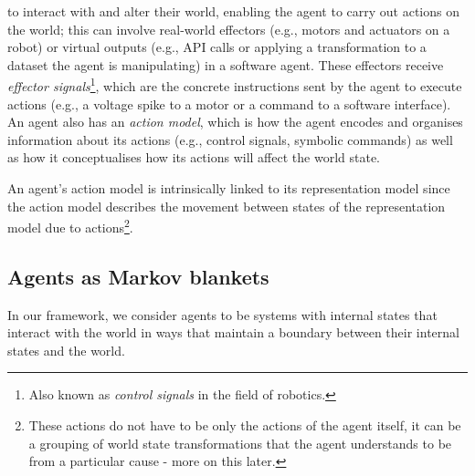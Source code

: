  to interact with and alter their world, enabling the agent to carry out actions on the world; this can involve real-world effectors (e.g., motors and actuators on a robot) or virtual outputs (e.g., API calls or applying a transformation to a dataset the agent is manipulating) in a software agent.
These effectors receive \emph{effector signals}\footnote{Also known as \emph{control signals} in the field of robotics.}, which are the concrete instructions sent by the agent to execute actions (e.g., a voltage spike to a motor or a command to a software interface).
An agent also has an \emph{action model}, which is how the agent encodes and organises information about its actions (e.g., control signals, symbolic commands) as well as how it conceptualises how its actions will affect the world state.

An agent's action model is intrinsically linked to its representation model since the action model describes the movement between states of the representation model due to actions\footnote{These actions do not have to be only the actions of the agent itself, it can be a grouping of world state transformations that the agent understands to be from a particular cause - more on this later.}.



\subsection{Agents as Markov blankets}

In our framework, we consider agents to be systems with internal states that interact with the world in ways that maintain a boundary between their internal states and the world.

